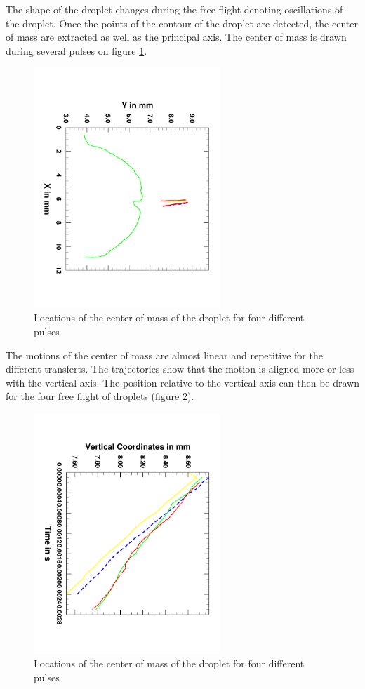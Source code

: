 \documentclass[12pt]{iopart}
\begin{document}
The shape of the droplet changes during the free flight denoting oscillations of the droplet.
Once the points of the contour of the droplet are detected, the center of mass are extracted  as well as the principal axis.
The center of mass is drawn during several pulses on figure \ref{fig::center_mass}.

\begin{figure}[h!]
\centering    
\includegraphics[width=7cm,angle=90]{images/Trajectory.pdf}
\caption{Locations of the center of mass of the droplet for four different pulses}
\label{fig::center_mass}
\end{figure}

The motions of the center of mass are almost linear and repetitive for the different transferts.
The trajectories show that the motion is aligned more or less with the vertical axis.
The position relative to the vertical axis can then be drawn for the four free 
flight of droplets (figure \ref{fig::velocities}).
 

\begin{figure}[h!]
\centering    
\includegraphics[width=7cm,angle=90]{images/Velocities.pdf}
\caption{Locations of the center of mass of the droplet for four different pulses}
\label{fig::velocities}
\end{figure}
\end{document}
